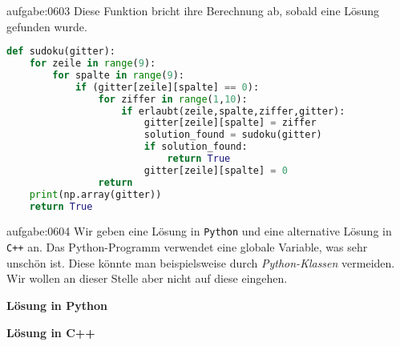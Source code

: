 \begin{antwort}{aufgabe:0603}
Diese Funktion bricht ihre Berechnung ab, sobald eine Lösung gefunden wurde.
\begin{lstlisting}[language=Python,caption=Implementation der Funktion \pythoninline{sudoku},label=listing:sudokuUnique]
def sudoku(gitter):
	for zeile in range(9):
		for spalte in range(9):
			if (gitter[zeile][spalte] == 0):
				for ziffer in range(1,10):
					if erlaubt(zeile,spalte,ziffer,gitter):
						gitter[zeile][spalte] = ziffer
						solution_found = sudoku(gitter)
						if solution_found:
							return True
						gitter[zeile][spalte] = 0
				return
	print(np.array(gitter))
	return True
\end{lstlisting} 
\end{antwort}




\begin{antwort}{aufgabe:0604}
\lstset{basicstyle=\ttfamily\footnotesize}
Wir geben eine Lösung in \verb|Python| und eine alternative Lösung in \verb|C++| an. Das Python-Programm verwendet eine globale Variable, was sehr unschön ist. Diese könnte man beispielsweise durch \textit{Python-Klassen} vermeiden. Wir wollen an dieser Stelle aber nicht auf diese eingehen.
\vspace{1cm}

\noindent
\textbf{Lösung in Python}


\noindent
\textbf{Lösung in C++}



\end{antwort}

\lstset{style=mystyle}


\clearpage
\shipoutAnswer